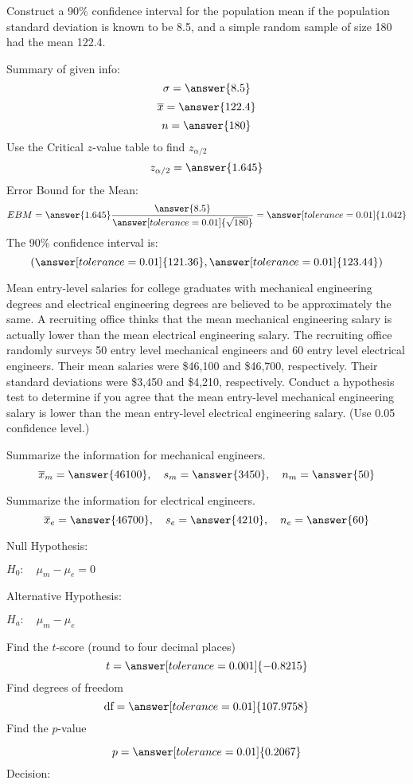 \documentclass{ximera}
\begin{document}
\begin{problem}\label{prob:exam3prob2}
Construct a 90\% confidence interval for the population mean if the population standard deviation is known to be 8.5, and a simple random sample of size 180 had the mean 122.4.

Summary of given info:
$$\sigma=\answer{8.5}$$
$$\overline{x}=\answer{122.4}$$
$$n=\answer{180}$$
Use the Critical $z$-value table to find $z_{\alpha/2}$
$$z_{\alpha/2}=\answer{1.645}$$
Error Bound for the Mean:
$$EBM=\answer{1.645}\frac{\answer{8.5}}{\answer[tolerance=0.01]{\sqrt{180}}}=\answer[tolerance=0.01]{1.042}$$
The 90\% confidence interval is:
$$(\answer[tolerance=0.01]{121.36},\answer[tolerance=0.01]{123.44})$$
\end{problem}

\begin{problem}\label{prob:exam3prob3}
Mean entry-level salaries for college graduates with mechanical engineering degrees and electrical engineering degrees are believed to be approximately the same. A recruiting office thinks that the mean mechanical engineering salary is
actually lower than the mean electrical engineering salary. The recruiting office randomly surveys 50 entry level mechanical
engineers and 60 entry level electrical engineers. Their mean salaries were \$46,100 and \$46,700, respectively. Their
standard deviations were \$3,450 and \$4,210, respectively. Conduct a hypothesis test to determine if you agree that the mean
entry-level mechanical engineering salary is lower than the mean entry-level electrical engineering salary. (Use 0.05 confidence level.)

Summarize the information for mechanical engineers.
$$\overline{x}_m=\answer{46100},\quad s_m=\answer{3450},\quad n_m=\answer{50}$$

Summarize the information for electrical engineers.
$$\overline{x}_e=\answer{46700},\quad s_e=\answer{4210},\quad n_e=\answer{60}$$

Null Hypothesis:

$H_0:\quad \mu_m-\mu_e=0$ 

Alternative Hypothesis:

$H_a:\quad \mu_m-\mu_e$ 

Find the $t$-score (round to four decimal places)
$$t=\answer[tolerance=0.001]{-0.8215}$$
Find degrees of freedom
$$\mbox{df}=\answer[tolerance=0.01]{107.9758}$$
Find the $p$-value
\begin{center}  
\end{center}
$$p=\answer[tolerance=0.01]{0.2067}$$
Decision:


\end{problem}
\end{document}
